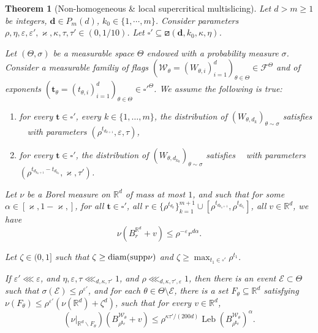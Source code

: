 \documentclass[11pt, leqno, fleqn]{amsart}
\def\cW{\mathcal W}
\def\eps{\varepsilon}
\def\cF{          \mathcal F}
\def\cE{          \mathcal E}
\def\br{        \mathbf{r}}
\def\bt{        \mathbf{t}}
\def \R{{\mathbb R}}
\newcommand{\bs}{{\mathbf s}}
\newcommand{\bd}{\mathbf{d}}
\DeclareMathOperator{\leb}{Leb}
\DeclareMathOperator{\SubP}{(S^{-})}
\DeclareMathOperator{\SupP}{(S^+)}
\newcommand{\increasing}{\boxslash}         %
\newcommand{\enmt}{\begin{enumerate}}
\newcommand{\eenmt}{\end{enumerate}}
\newtheorem{thm}{\bf Theorem}[section]
\theoremstyle{definition}
\DeclareMathOperator{\diam}{diam}
\theoremstyle{definition}
\def\supp{{\rm supp}}
\begin{document}
		
		  \begin{thm}[Non-homogeneous \& local supercritical multislicing] \label{thm Multislicing0}
		 	Let $d>m \geq1$ be integers, $\bd\in P_{m}(d)$, $k_{0}\in \{1, \cdots, m\} $. 
			Consider parameters    $\rho, \eta, \eps, \eps', \varkappa, \kappa, \tau, \tau' \in (0, 1/10)$.  Let $\square'\subseteq \increasing(\bd, k_{0}, \kappa, \eta)$.   
		 	
		 	Let $(\Theta, \sigma)$ be a measurable space $\Theta$ endowed with a probability measure $\sigma$.  Consider a measurable familiy of flags $(\cW_{\theta} = ( W_{\theta, i} )_{i = 1}^{d} )_{\theta\in \Theta} \in \cF^{\Theta}$ and  of exponents $(\bt_{\theta} = (t_{\theta, i})_{i = 1}^{d} )_{\theta \in \Theta} \in \square'^{\Theta}$.
		 	We assume the following is true:
		 	\enmt
		 	\item for every $\bt\in \square'$, every $k\in \{1, \dots, m \}$, the distribution of $(W_{\theta, d_k})_{\theta\sim \sigma}$  satisfies $\SubP$ with parameters $( \rho^{t_{d_{k+1}}},    \eps, \tau)$, 
		 	\item for  every $\bt\in \square'$, the distribution of $(W_{\theta, d_{k_{0}} })_{\theta\sim \sigma}$  satisfies $\SupP$ with parameters $(\rho^{t_{d_{k_{0}+1}}-t_{d_{k_{0}}}}, \varkappa,\tau')$. 
		 	\eenmt  
		 	
		 	
		 	Let $\nu$ be a Borel measure on $\R^d$ of mass  at most $1$,    and such that for some $\alpha\in [\varkappa, 1-\varkappa,]$,  for all  $\bt\in \square'$,     all   $r \in \{\rho^{t_{d_k}}\}_{k=1}^{m+1}\cup [  \rho^{t_{d_{k_{0}+1}}}, \rho^{t_{d_{k_{0}}}} ]$, all $v \in \R^d$,  we have
		 	$$\nu(B^{\R^d}_{r} + v)\leq\rho^{-\eps} r^{d\alpha}.$$
		 	
		 	Let $\zeta\in(0,1]$ such that $\zeta \geq \diam (\supp \nu) $ and $\zeta \geq\max_{t_{1}\in \square'}\rho^{t_{1}}$.
		 	
		 	If $\eps' \lll  \eps$, and $\eta, \eps, \tau \lll_{d, \kappa, \tau'}1$, and $\rho\lll_{d, \kappa, \tau', \eps} 1$, then there is an event $\cE \subset \Theta$ such that $\sigma(\cE) \leq \rho^{\eps'}$, and for each $\theta \in \Theta \setminus \cE$, there is a set $F_{\theta} \subseteq \R^d$ satisfying  $\nu( F_{\theta}) \leq \rho^{\eps'}(\nu(\R^d)+\zeta^{d})$, such that  for every $v \in \R^d$,  
	 	$$( \nu|_{\R^d \smallsetminus F_{\theta}} )\left( B^{\cW_{\theta}}_{\rho^{\bt_{\theta} }}+ v \right) \leq \rho^{\kappa \tau'/( 200 d) }   \leb \left(B^{\cW_{ \theta}}_{\rho^{\bt_{ \theta}}}\right)^{\alpha}.$$
		 \end{thm}
\end{document}
